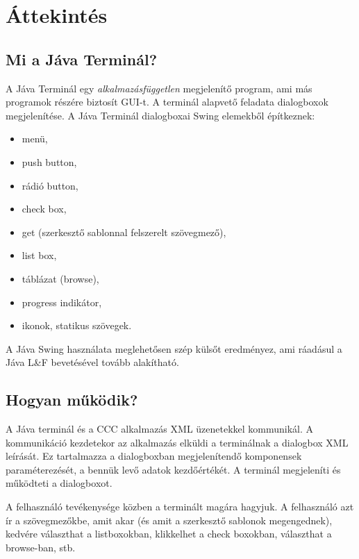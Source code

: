 
\def\htmlfigext{\png}
 
\section{Áttekintés}

\subsection{Mi a Jáva Terminál?}
 
A Jáva Terminál egy {\em alkalmazásfüggetlen} megjelenítő program,
ami más programok részére biztosít GUI-t.
A terminál alapvető feladata dialogboxok  megjelenítése.
A Jáva Terminál dialogboxai Swing elemekből építkeznek:
\begin{itemize}
\item menü, 
\item push button, 
\item rádió button, 
\item check box, 
\item get (szerkesztő sablonnal felszerelt szövegmező),
\item list box, 
\item táblázat (browse), 
\item progress indikátor, 
\item ikonok, statikus szövegek.
\end{itemize}
A Jáva Swing használata meglehetősen szép külsőt eredményez,
ami ráadásul a Jáva L\&F bevetésével tovább alakítható.


\subsection{Hogyan működik?}
 
A Jáva terminál és a CCC alkalmazás XML üzenetekkel kommunikál.
A kommunikáció kezdetekor az alkalmazás elküldi a terminálnak
a dialogbox XML leírását. Ez tartalmazza a dialogboxban megjelenítendő
komponensek paraméterezését, a bennük levő adatok kezdőértékét.
A terminál megjeleníti és működteti a dialogboxot.

A felhasználó tevékenysége közben a terminált magára hagyjuk. 
A felhasználó azt ír a szövegmezőkbe, amit akar
(és amit a szerkesztő sablonok megengednek), 
kedvére választhat a listboxokban, 
klikkelhet a check boxokban, 
választhat a browse-ban, stb.
  
